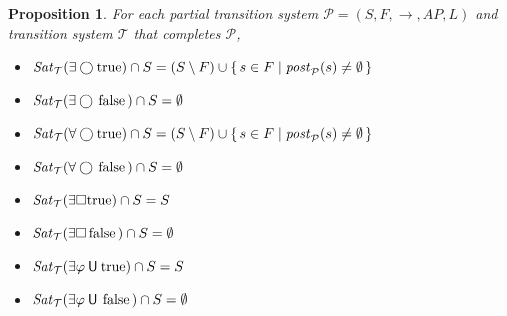 \documentclass[12pt]{article}
\newcommand{\always}{\Box}
\newcommand{\nxt}{\bigcirc}
\newcommand{\until}{\mathbin{\sf U}}
\newcommand{\TRUE}{\mbox{\lstinline{true}}}
\newcommand{\FALSE}{\mbox{\lstinline{false}}}
\newtheorem{proposition}{Proposition}
\theoremstyle{definition}
\begin{document}
\begin{proposition}
For each partial transition system $\mathcal{P} = (S, F, \rightarrow, \mathit{AP}, L)$ and transition system $\mathcal{T}$ that completes $\mathcal{P}$,
\begin{itemize}
\item[(a)]
$\mathit{Sat}_{\mathcal{T}}(\exists \nxt \TRUE) \cap S = (S \setminus F) \cup \{\, s \in F \mid \mathit{post}_{\mathcal{P}}(s) \not= \emptyset \,\}$
\item[(b)]
$\mathit{Sat}_{\mathcal{T}}(\exists \nxt \FALSE) \cap S = \emptyset$
\item[(c)]
$\mathit{Sat}_{\mathcal{T}}(\forall \nxt \TRUE) \cap S = (S \setminus F) \cup \{\, s \in F \mid \mathit{post}_{\mathcal{P}}(s) \not= \emptyset \,\}$
\item[(d)]
$\mathit{Sat}_{\mathcal{T}}(\forall \nxt \FALSE) \cap S = \emptyset$
\item[(e)]
$\mathit{Sat}_{\mathcal{T}}(\exists \always \TRUE) \cap S = S$
\item[(f)]
$\mathit{Sat}_{\mathcal{T}}(\exists \always \FALSE) \cap S = \emptyset$
\item[(g)]
$\mathit{Sat}_{\mathcal{T}}(\exists \varphi \until \TRUE) \cap S = S$
\item[(h)]
$\mathit{Sat}_{\mathcal{T}}(\exists \varphi \until \FALSE) \cap S = \emptyset $
\end{itemize}
\end{proposition}
\end{document}
